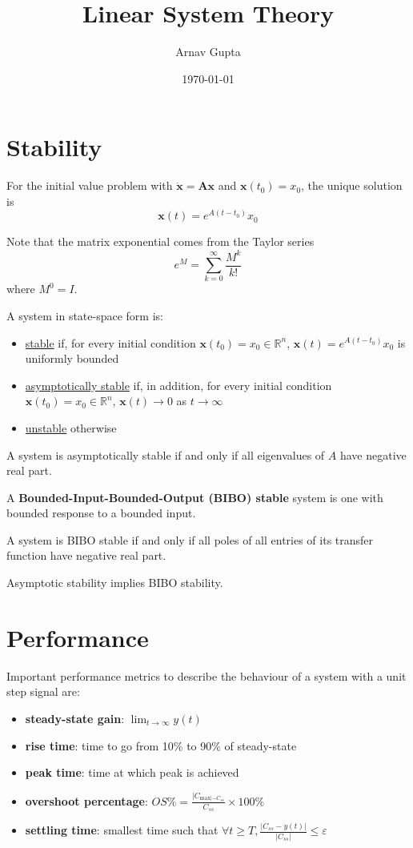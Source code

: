 \documentclass[11pt]{article}
\author{Arnav Gupta}
\date{\today}
\title{Linear System Theory}
\begin{document}
\maketitle
\tableofcontents

\section{Stability}
\label{sec:org084a7cb}
For the initial value problem with \(\dot{\mathbf{x}} = \mathbf{Ax}\) and
\(\mathbf{x}(t_{0}) = x_{0}\),
the unique solution is
$$
\mathbf{x}(t) = e^{A(t-t_{0})} x_{0}
$$

Note that the matrix exponential comes from the Taylor series
$$
e^{M} = \sum_{k = 0}^{\infty} \frac{M^{k}}{k!}
$$
where \(M^{0} = I\).

A system in state-space form is:
\begin{itemize}
\item \uline{stable} if, for every initial condition \(\mathbf{x}(t_{0}) = x_{0} \in \mathbb{R}^{n}\),
\(\mathbf{x}(t) = e^{A(t - t_{0})} x_{0}\) is uniformly bounded
\item \uline{asymptotically stable} if, in addition, for every initial condition \(\mathbf{x}(t_{0}) = x_{0} \in \mathbb{R}^{n}\),
\(\mathbf{x}(t) \to 0\) as \(t \to \infty\)
\item \uline{unstable} otherwise
\end{itemize}

A system is asymptotically stable if and only if all eigenvalues of \(A\) have negative real part.

A \textbf{Bounded-Input-Bounded-Output (BIBO) stable} system is one with bounded response to a bounded input.

A system is BIBO stable if and only if all poles of all entries of its transfer function have negative real
part.

Asymptotic stability implies BIBO stability.
\section{Performance}
\label{sec:orgb5b5903}
Important performance metrics to describe the behaviour of a system with a unit step signal are:
\begin{itemize}
\item \textbf{steady-state gain}: \(\lim_{t \to \infty} y(t)\)
\item \textbf{rise time}: time to go from 10\% to 90\% of steady-state
\item \textbf{peak time}: time at which peak is achieved
\item \textbf{overshoot percentage}: \(OS\% = \frac{|C_{\text{max}| - C_{ss}}}{C_{ss}} \times 100 \%\)
\item \textbf{settling time}: smallest time such that \(\forall t \ge T, \frac{|C_{ss}-y(t)|}{|C_{ss}|} \le \varepsilon\)
\end{itemize}
\end{document}
